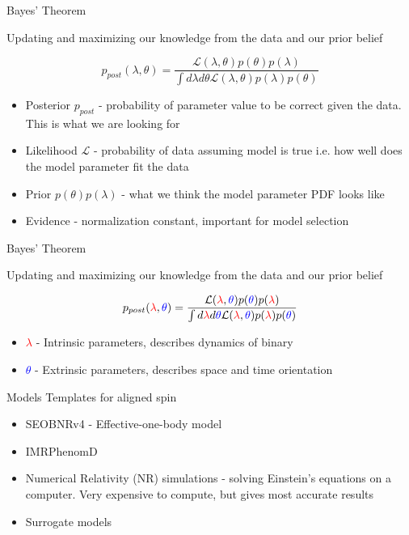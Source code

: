 \documentclass[uncompress,aspectratio=43]{beamer}  %
\newcommand{\red}{\textcolor{red}}
\newcommand{\blue}{\textcolor{blue}}
\begin{document}
\begin{frame}{Bayes' Theorem}

Updating and maximizing our knowledge from the data and our prior belief
\begin{center}
  $$
  p_{post}(\lambda, \theta) =
  \frac{\mathcal{L}(\lambda, \theta) p(\theta)p(\lambda)}
  {\int d\lambda d\theta \mathcal{L}(\lambda, \theta) p(\lambda) p(\theta)}
  $$
\end{center}
  
\begin{itemize}
\item Posterior $p_{post}$ - probability of parameter value to be correct given the
  data. This is what we are looking for
\item Likelihood $\mathcal{L}$ - probability of data assuming model is true i.e.
  how well does the model parameter fit the data
\item Prior $p(\theta)p(\lambda)$ - what we think the model parameter PDF looks like
\item Evidence - normalization constant, important for model selection
\end{itemize}

\end{frame}

\begin{frame}{Bayes' Theorem}

  Updating and maximizing our knowledge from the data and our prior belief
\begin{center}
  $$
  p_{post}(\red{\lambda}, \blue{\theta}) =
  \frac{\mathcal{L}(\red{\lambda}, \blue{\theta}) p(\blue{\theta})p(\red{\lambda})}
  {\int d\red{\lambda} d\blue{\theta} \mathcal{L}(\red{\lambda}, \blue{\theta}) p(\red{\lambda}) p(\blue{\theta})}
  $$
\end{center}
  
\begin{itemize}
\item \red{$\lambda$} - Intrinsic parameters, describes dynamics of binary
\item \blue{$\theta$} - Extrinsic parameters, describes space and time orientation
\end{itemize}

\end{frame}
\begin{frame}{Models}
Templates for aligned spin 
  \begin{itemize}
  \item SEOBNRv4 - Effective-one-body model
  \item IMRPhenomD
    \item Numerical Relativity (NR) simulations - solving Einstein's equations on
      a computer. Very expensive to compute, but gives most accurate results
\pause
    \item Surrogate models
\end{itemize}
\end{frame}
\end{document}
